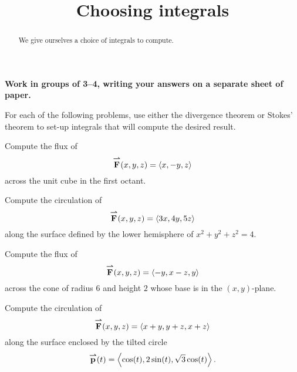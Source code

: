 \documentclass[handout]{ximera}
\title[Collaborate:]{Choosing integrals}
\begin{document}
\begin{abstract}
We give ourselves a choice of integrals to compute.
\end{abstract}
\maketitle

\textbf{Work in groups of 3--4, writing your answers on a separate
  sheet of paper.}

For each of the following problems, use either the divergence theorem
or Stokes' theorem to set-up integrals that will compute the desired
result.



\begin{problem}
  Compute the flux of
  \[
  {\overset{\boldsymbol{\rightharpoonup}}{\mathbf{F}}}(x,y,z) = \left\langle x,-y,z\right\rangle
  \]
  across the unit cube in the first octant.
\end{problem}



\begin{problem}
  Compute the circulation of
  \[
  {\overset{\boldsymbol{\rightharpoonup}}{\mathbf{F}}}(x,y,z) = \left\langle 3x,4y,5z\right\rangle
  \]
  along the surface defined by the lower hemisphere of $x^2 + y^2 +
  z^2 = 4$.
\end{problem}

\begin{problem}
  Compute the flux of
  \[
  {\overset{\boldsymbol{\rightharpoonup}}{\mathbf{F}}}(x,y,z) = \left\langle -y,x-z,y\right\rangle
  \]
  across the cone of radius $6$ and height $2$ whose base is in the
  $(x,y)$-plane.
\end{problem}

\begin{problem}
  Compute the circulation of
  \[
  {\overset{\boldsymbol{\rightharpoonup}}{\mathbf{F}}}(x,y,z) = \left\langle x+y,y+z,x+z\right\rangle
  \]
  along the surface enclosed by the tilted circle
  \[
  {\overset{\boldsymbol{\rightharpoonup}}{\mathbf{p}}}(t) = \left\langle \cos(t), 2\sin(t),\sqrt{3}\cos(t)\right\rangle.
  \]
\end{problem}
\end{document}

